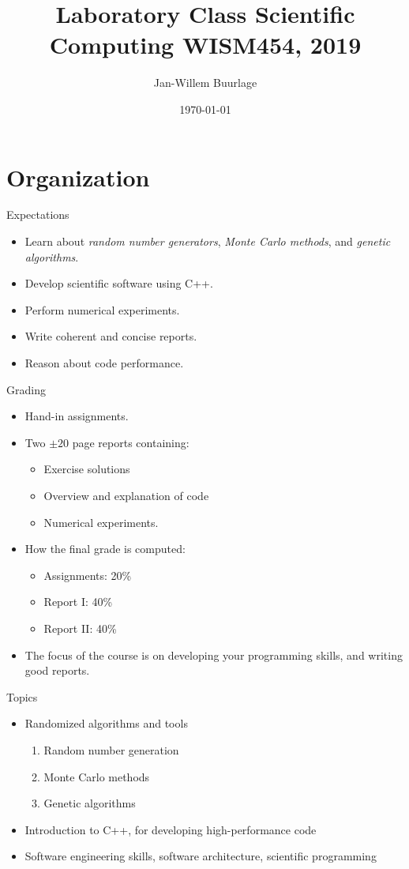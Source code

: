 \documentclass[10pt]{beamer}
\author{Jan-Willem Buurlage}
\date{\today}
\title{Laboratory Class Scientific Computing WISM454, 2019}
\begin{document}
\maketitle

\section{Organization}
\label{sec:orgb8c71dd}
\begin{frame}[label={sec:org4fcb14b}]{Expectations}
\begin{itemize}
\item Learn about \emph{random number generators}, \emph{Monte Carlo methods}, and \emph{genetic
algorithms}.
\item Develop \alert{scientific software} using C++.
\item Perform \alert{numerical experiments}.
\item Write \alert{coherent and concise reports}.
\item Reason about \alert{code performance}.
\end{itemize}
\end{frame}
\begin{frame}[label={sec:org57e8246}]{Grading}
\begin{itemize}
\item Hand-in assignments.
\item Two \(\pm 20\) page reports containing:
\begin{itemize}
\item Exercise solutions
\item Overview and explanation of code
\item Numerical experiments.
\end{itemize}
\item How the final grade is computed:
\begin{itemize}
\item \alert{\alert{Assignments:}} 20\%
\item \alert{\alert{Report I:}} 40\%
\item \alert{\alert{Report II:}} 40\%
\end{itemize}
\item The focus of the course is on developing your programming skills, and writing
good reports.
\end{itemize}
\end{frame}
\begin{frame}[label={sec:org499dbee}]{Topics}
\begin{itemize}
\item \alert{Randomized algorithms and tools}
\begin{enumerate}
\item Random number generation
\item Monte Carlo methods
\item Genetic algorithms
\end{enumerate}
\item Introduction to C++, for developing \alert{high-performance code}
\item Software engineering skills, software architecture, \alert{scientific programming}
\end{itemize}
\end{frame}
\end{document}
